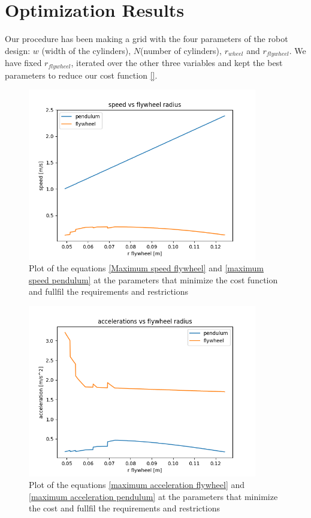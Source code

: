 \section{Optimization Results} \label{sec: parameters results}

Our procedure has been making a grid with the four parameters of the robot 
design: $w$ (width of the cylinders), $N$(number of cylinders), $r_{wheel}$ and $r_{flywheel}$.
We have fixed $r_{flywheel}$, iterated over the other three variables and kept the best
parameters to reduce our cost function \ref{}.


\begin{figure}[H]
	\centering
	\includegraphics[width=10cm]{img/optimization/speed.png}
	\caption{Plot of the equations \ref{Maximum speed flywheel} and \ref{maximum speed pendulum} at the parameters that minimize the cost function and fullfil the requirements and restrictions}
	\label{fig:Speed plot}
\end{figure}

\begin{figure}[H]
	\centering
	\includegraphics[width=10cm]{img/optimization/acceleration.png}
	\caption{Plot of the equations \ref{maximum acceleration flywheel} and \ref{maximum acceleration pendulum} at the parameters that minimize the cost and fullfil the requirements and restrictions}
	\label{fig:Speed plot}
\end{figure}

